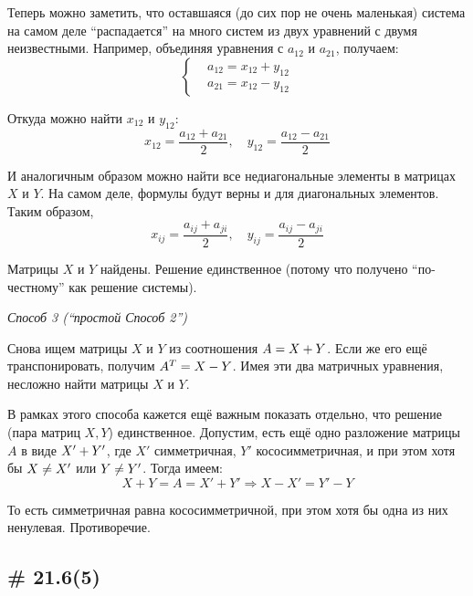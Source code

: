 \documentclass[a4paper,12pt]{article}
\begin{document}
\begin{solution}
    Теперь можно заметить, что оставшаяся (до сих пор не очень маленькая) система на самом деле ``распадается'' на много систем из двух уравнений с двумя неизвестными.
    Например, объединяя уравнения с $a_{12}$ и $a_{21}$, получаем:
    \[
      \left\{
        \begin{aligned}
          &a_{12} = x_{12} + y_{12}\\
          &a_{21} = x_{12} - y_{12}
        \end{aligned}
      \right.
    \]
    
    Откуда можно найти $x_{12}$ и $y_{12}$:
    \[
      x_{12} = \frac{a_{12} + a_{21}}{2},\quad y_{12} = \frac{a_{12} - a_{21}}{2}
    \]
    
    И аналогичным образом можно найти все недиагональные элементы в матрицах $X$ и $Y$.
    На самом деле, формулы будут верны и для диагональных элементов.
    Таким образом,
    \[
      x_{ij} = \frac{a_{ij} + a_{ji}}{2},\quad y_{ij} = \frac{a_{ij} - a_{ji}}{2}
    \]
    
    Матрицы $X$ и $Y$ найдены.
    Решение единственное (потому что получено ``по-честному'' как решение системы).
    
    \bigskip
    
    \emph{Способ 3 (``простой Способ 2'')}
    
    Снова ищем матрицы $X$ и $Y$ из соотношения $A \hm= X \hm+ Y$.
    Если же его ещё транспонировать, получим $A^T \hm= X \hm- Y$.
    Имея эти два матричных уравнения, несложно найти матрицы $X$ и $Y$.
    
    В рамках этого способа кажется ещё важным показать отдельно, что решение (пара матриц $X, Y$) единственное.
    Допустим, есть ещё одно разложение матрицы $A$ в виде $X' \hm+ Y'$, где $X'$ симметричная, $Y'$ кососимметричная, и при этом хотя бы $X \hm{\not=} X'$ или $Y \hm{\not= Y'}$.
    Тогда имеем:
    \[
      X + Y = A = X' + Y' \Rightarrow X - X' = Y' - Y
    \]
    
    То есть симметричная равна кососимметричной, при этом хотя бы одна из них ненулевая.
    Противоречие.
  \end{solution}
  
  
  \subsection{\# 21.6(5)}
  
\end{document}
